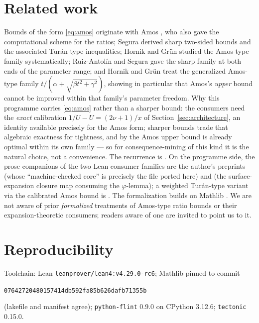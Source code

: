 \documentclass[11pt]{article}
\newcommand{\lean}[1]{\texttt{#1}}
\begin{document}
\section{Related work}\label{sec:related}

Bounds of the form \eqref{eq:amos} originate with Amos
\cite{Amos74}, who also gave the computational scheme for the ratios;
Segura \cite{Segura11} derived sharp two-sided bounds and the
associated Tur\'an-type inequalities; Hornik and Gr\"un
\cite{HG13} studied the Amos-type family systematically;
Ruiz-Antol\'in and Segura \cite{RS16} gave the sharp family at both
ends of the parameter range; and Hornik and Gr\"un \cite{HG24}
treat the generalized Amos-type family
$t/(\alpha + \sqrt{\beta t^2 + \gamma^2})$, showing in particular
that Amos's \emph{upper} bound cannot be improved within that
family's parameter freedom.  Why this programme carries
\eqref{eq:amos} rather than a sharper bound: the consumers need the
\emph{exact} calibration $1/U - U = (2\nu+1)/x$ of
Section~\ref{sec:architecture}, an identity available precisely for
the Amos form; sharper bounds \cite{Segura11,RS16} trade that
algebraic exactness for tightness, and by \cite{HG24} the Amos upper
bound is already optimal within its own family --- so for
consequence-mining of this kind it is the natural choice, not a
convenience.  The recurrence is \cite[10.29.1]{DLMF}.  On the programme
side, the prose companions of the two Lean consumer families are the
author's preprints \cite{ErikssonFH26} (whose ``machine-checked
core'' is precisely the file ported here) and \cite{ErikssonVM26}
(the surface-expansion closure map consuming the $\varphi$-lemma);
a weighted Tur\'an-type variant via the calibrated Amos bound is
\cite{ErikssonTuran26}.  The formalization builds on Mathlib
\cite{mathlib20}.  We are not aware of prior \emph{formalized}
treatments of Amos-type ratio bounds or their expansion-theoretic
consumers; readers aware of one are invited to point us to it.

\section{Reproducibility}\label{sec:repro}

Toolchain: Lean \lean{leanprover/lean4:v4.29.0-rc6}; Mathlib pinned
to commit
\begin{center}\small
\lean{07642720480157414db592fa85b626dafb71355b}
\end{center}
\noindent (lakefile and manifest agree); \lean{python-flint} 0.9.0 on
CPython 3.12.6; \lean{tectonic} 0.15.0.
\end{document}
